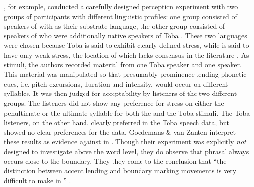 \documentclass[output=paper
,modfonts
,nonflat]{langsci/langscibook}
\begin{document}
\citet{Goedemans2007}, for example, conducted a carefully designed perception experiment with two groups of participants with different linguistic profiles: one group consisted of speakers of  with  as their substrate language, the other group consisted of speakers of  who were additionally native speakers of Toba . These two languages were chosen because Toba  is said to exhibit clearly defined stress, while  is said to have only weak stress, the location of which lacks consensus in the literature \citep[40]{Goedemans2007}. As stimuli, the authors recorded material from one Toba   speaker and one   speaker. This material was manipulated so that presumably prominence-lending phonetic cues, i.e. pitch excursions, duration and intensity, would occur on different syllables. It was then judged for acceptability by listeners of the two different groups. The  listeners did not show any preference for stress on either the penultimate or the ultimate syllable for both the   and the Toba   stimuli. The Toba  listeners, on the other hand, clearly preferred  in the Toba  speech data, but showed no clear preferences for the  data. Goedemans \& van Zanten interpret these results as evidence against  in  . Though their experiment was explicitly \textit{not} designed to investigate  above the word level, they do observe that phrasal  always occurs close to the boundary. They they come to the conclusion that “the distinction between accent lending and boundary marking  movements is very difficult to make in ” \citep[57]{Goedemans2007}.
\end{document}
